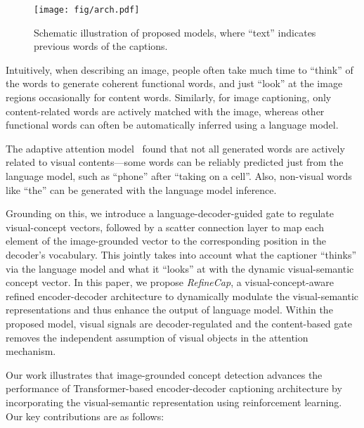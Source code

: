 \documentclass[11pt]{article}
\begin{document}
\begin{figure}[t]
\vskip 0mm
\begin{center}
\texttt{[image: fig/arch.pdf]}
\vskip -2mm
\caption{Schematic illustration of proposed models, where ``text'' indicates previous words of the captions.}
\label{fig:arch}
\end{center}
\vskip -8mm
\end{figure}


Intuitively, when describing an image, people often take much time to ``think'' of the words to generate coherent functional words, and just ``look'' at the image regions occasionally for content words. Similarly, for image captioning, only content-related words are actively matched with the image, whereas other functional words can often be automatically inferred using a language model.

The adaptive attention model~\cite{lu2017knowing} found that not all generated words are actively related to visual contents—some words can be reliably predicted just from the language model, such as ``phone'' after ``taking on a cell''. Also, non-visual words like ``the'' can be generated with the language model inference. 

Grounding on this, we introduce a language-decoder-guided gate to regulate visual-concept vectors, followed by a scatter connection layer to map each element of the image-grounded vector to the corresponding position in the decoder's vocabulary. This jointly takes into account what the captioner ``thinks'' via the language model and what it ``looks'' at with the dynamic visual-semantic concept vector. In this paper, we propose \emph{RefineCap}, a visual-concept-aware refined encoder-decoder architecture to dynamically modulate the visual-semantic representations and thus enhance the output of language model. Within the proposed model, visual signals are decoder-regulated and the content-based gate removes the independent assumption of visual objects in the attention mechanism.













Our work illustrates that image-grounded concept detection advances the performance of Transformer-based encoder-decoder captioning architecture by incorporating the visual-semantic representation using reinforcement learning. Our key contributions are as follows:
\end{document}
